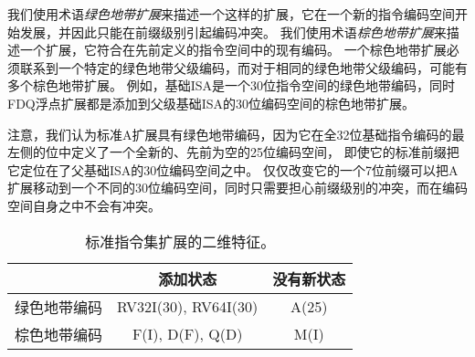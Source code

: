 我们使用术语{\em 绿色地带扩展}来描述一个这样的扩展，它在一个新的指令编码空间开始发展，并因此只能在前缀级别引起编码冲突。
我们使用术语{\em 棕色地带扩展}来描述一个扩展，它符合在先前定义的指令空间中的现有编码。
一个棕色地带扩展必须联系到一个特定的绿色地带父级编码，而对于相同的绿色地带父级编码，可能有多个棕色地带扩展。
例如，基础ISA是一个30位指令空间的绿色地带编码，同时FDQ浮点扩展都是添加到父级基础ISA的30位编码空间的棕色地带扩展。

注意，我们认为标准A扩展具有绿色地带编码，因为它在全32位基础指令编码的最左侧的位中定义了一个全新的、先前为空的25位编码空间，
即使它的标准前缀把它定位在了父基础ISA的30位编码空间之中。
仅仅改变它的一个7位前缀可以把A扩展移动到一个不同的30位编码空间，同时只需要担心前缀级别的冲突，而在编码空间自身之中不会有冲突。

\begin{table}[H]
{
\begin{center}
\begin{tabular}{|r|c|c|}
\hline
 & 添加状态 & 没有新状态 \\ \hline
绿色地带编码 & RV32I(30), RV64I(30) & A(25) \\\hline
棕色地带编码 & F(I), D(F), Q(D) & M(I) \\
\hline
\end{tabular}
\end{center}
}
\caption{标准指令集扩展的二维特征。
  }
\label{exttax}
\end{table}

